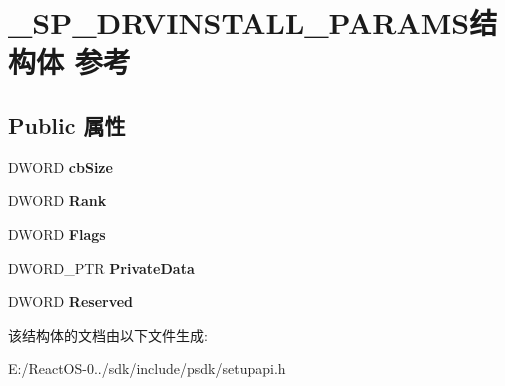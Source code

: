 \hypertarget{struct___s_p___d_r_v_i_n_s_t_a_l_l___p_a_r_a_m_s}{}\section{\+\_\+\+S\+P\+\_\+\+D\+R\+V\+I\+N\+S\+T\+A\+L\+L\+\_\+\+P\+A\+R\+A\+M\+S结构体 参考}
\label{struct___s_p___d_r_v_i_n_s_t_a_l_l___p_a_r_a_m_s}
\subsection*{Public 属性}
\begin{DoxyCompactItemize}
\item 
\mbox{\label{struct___s_p___d_r_v_i_n_s_t_a_l_l___p_a_r_a_m_s_a8734b44374461f2cf2cd80375684edb1}} 
D\+W\+O\+RD {\bfseries cb\+Size}
\item 
\mbox{\label{struct___s_p___d_r_v_i_n_s_t_a_l_l___p_a_r_a_m_s_af4148a6842f16d33a81c28d5fc7448f7}} 
D\+W\+O\+RD {\bfseries Rank}
\item 
\mbox{\label{struct___s_p___d_r_v_i_n_s_t_a_l_l___p_a_r_a_m_s_a70945f3c010d435e9f3d7df141ae9f25}} 
D\+W\+O\+RD {\bfseries Flags}
\item 
\mbox{\label{struct___s_p___d_r_v_i_n_s_t_a_l_l___p_a_r_a_m_s_a6c19227c2f185e5b1412f3f15af40600}} 
D\+W\+O\+R\+D\+\_\+\+P\+TR {\bfseries Private\+Data}
\item 
\mbox{\label{struct___s_p___d_r_v_i_n_s_t_a_l_l___p_a_r_a_m_s_aa124320872f8cb128073eec70634b495}} 
D\+W\+O\+RD {\bfseries Reserved}
\end{DoxyCompactItemize}


该结构体的文档由以下文件生成\+:\begin{DoxyCompactItemize}
\item 
E\+:/\+React\+O\+S-\/0../sdk/include/psdk/setupapi.\+h\end{DoxyCompactItemize}
